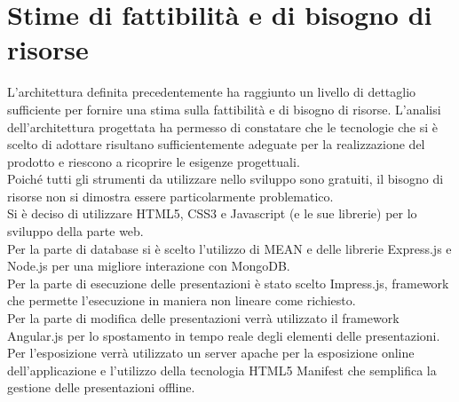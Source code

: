 \section{Stime di fattibilità e di bisogno di risorse}{
	L'architettura definita precedentemente ha raggiunto un livello di dettaglio sufficiente per fornire una stima sulla fattibilità e di bisogno di risorse. L'analisi dell'architettura progettata ha permesso di constatare che le tecnologie che si è scelto di adottare risultano sufficientemente adeguate per la realizzazione del prodotto e riescono a ricoprire le esigenze progettuali.\\
	Poiché tutti gli strumenti da utilizzare nello sviluppo sono gratuiti, il bisogno di
	risorse non si dimostra essere particolarmente problematico.\\
	Si è deciso di utilizzare HTML5, CSS3 e Javascript (e le sue librerie) per lo sviluppo della parte web.\\
	Per la parte di database si è scelto l'utilizzo di MEAN e delle librerie Express.js e Node.js per una migliore interazione con MongoDB.\\
	Per la parte di esecuzione delle presentazioni è stato scelto Impress.js, framework che permette l'esecuzione in maniera non lineare come richiesto.\\
	Per la parte di modifica delle presentazioni verrà utilizzato il framework Angular.js per lo spostamento in tempo reale degli elementi delle presentazioni.
	Per l'esposizione verrà utilizzato un server apache per la esposizione online dell'applicazione e l'utilizzo della tecnologia HTML5 Manifest che semplifica la gestione delle presentazioni offline.
	}